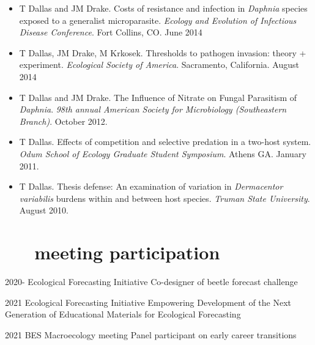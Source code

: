 \documentclass[]{CV}
\begin{document}
\begin{itemize}
\item {\mefont T Dallas} and JM Drake. Costs of resistance and infection in \textit{Daphnia} species exposed to a generalist microparasite. \textit{Ecology and Evolution of Infectious Disease Conference}. Fort Collins, CO. June 2014

\item  {\mefont T Dallas}, JM Drake, M Krkosek. Thresholds to pathogen invasion: theory + experiment. \textit{Ecological Society of America}. Sacramento, California. August 2014

\item {\mefont T Dallas} and JM Drake. The Influence of Nitrate on Fungal Parasitism of \textit{Daphnia}. \textit{98th annual American Society for Microbiology (Southeastern Branch)}. October 2012.

\item {\mefont T Dallas}. Effects of competition and selective predation in a two-host system. \textit{Odum School of Ecology Graduate Student Symposium}. Athens GA. January 2011.

\item {\mefont T Dallas}. Thesis defense: An examination of variation in \textit{Dermacentor variabilis} burdens within and between host species. \textit{Truman State University}. August 2010.

\end{itemize}










\section{\faVideoCamera \ \ \ meeting participation}

\begin{entrylist}

  \entry
    {2020-}
		{Ecological Forecasting Initiative }
    {Co-designer of beetle forecast challenge}

  \entry
    {2021}
		{Ecological Forecasting Initiative}
    {Empowering Development of the Next Generation of Educational Materials for Ecological Forecasting}

  \entry
    {2021}
		{BES Macroecology meeting}
    {Panel participant on early career transitions}


\end{entrylist}
\end{document}
